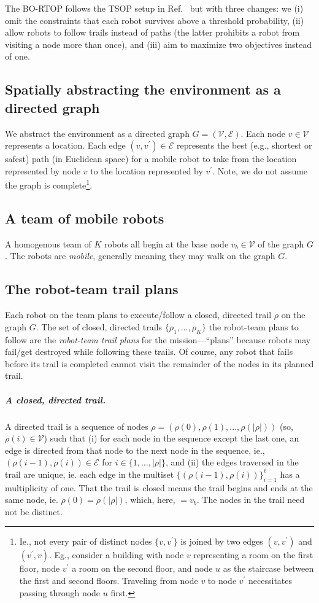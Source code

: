 \documentclass[11pt, oneside]{article}
\begin{document}
The BO-RTOP follows the TSOP setup in Ref.~\cite{jorgensen2018team} but with three changes: we (i) omit the constraints that each robot survives above a threshold probability, (ii) allow robots to follow trails instead of paths (the latter prohibits a robot from visiting a node more than once), and (iii) aim to maximize two objectives instead of one.

\subsection{Spatially abstracting the environment as a directed graph}
We abstract the environment as a directed graph $G=(\mathcal{V}, \mathcal{E})$. Each node $v\in \mathcal{V}$ represents a location. Each edge $(v, v^\prime) \in \mathcal{E}$ represents the best (e.g., shortest or safest) path (in Euclidean space) for a mobile robot to take from the location represented by node $v$ to the location represented by $v^\prime$.
Note, we do not assume the graph is complete\footnote{Ie., not every pair of distinct nodes $\{v, v^\prime\}$ is joined by two edges $(v, v^\prime)$ and $(v^\prime, v)$. 
Eg., consider a building with node $v$ representing a room on the first floor, node $v^\prime$ a room on the second floor, and node $u$ as the staircase between the first and second floors. Traveling from node $v$ to node $v^\prime$ necessitates passing through node $u$ first.}.

\subsection{A team of mobile robots}
A homogenous team of $K$ robots all begin at the base node $v_b \in \mathcal{V}$ of the graph $G$. The robots are \emph{mobile}, generally meaning they may walk on the graph $G$.

\subsection{The robot-team trail plans}
Each robot on the team plans to execute/follow a closed, directed trail $\rho$ on the graph $G$.  
The set of closed, directed trails $\{\rho_1, ..., \rho_K\}$ the robot-team plans to follow are the \emph{robot-team trail plans} for the mission---``plans'' because robots may fail/get destroyed while following these trails. 
Of course, any robot that fails before its trail is completed cannot visit the remainder of the nodes in its planned trail.

\subparagraph{A closed, directed trail.} A directed trail is a sequence of nodes $\rho=(\rho(0), \rho(1), ..., \rho(\lvert \rho \rvert))$ (so, $\rho(i) \in \mathcal{V}$) such that 
(i) for each node in the sequence except the last one, an edge is directed from that node to the next node in the sequence, ie., $(\rho(i-1), \rho(i))\in\mathcal{E}$ for $i \in \{1, ..., \lvert \rho \rvert \}$,
and 
(ii) the edges traversed in the trail are unique, ie. each edge in the multiset $\{(\rho(i-1), \rho(i))\}_{i=1}^{\ell}$ has a multiplicity of one.
That the trail is closed means the trail begins and ends at the same node, ie. $\rho(0)=\rho(\lvert \rho \rvert)$, which, here, $=v_b$.
The nodes in the trail need not be distinct.
\end{document}
